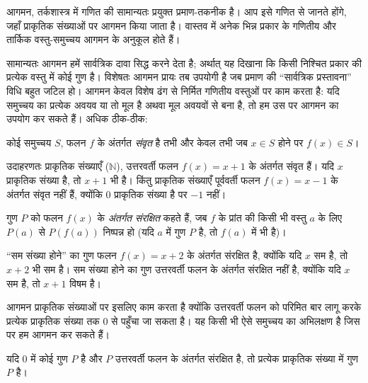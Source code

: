 \documentclass[../../include/open-logic-section]{subfiles}
\begin{document}


\begin{explain}
आगमन, तर्कशास्त्र में गणित की सामान्यतः प्रयुक्त प्रमाण-तकनीक है। आप इसे
गणित से जानते होंगे, जहाँ प्राकृतिक संख्याओं पर आगमन किया जाता है। वास्तव
में अनेक भिन्न प्रकार के गणितीय और तार्किक वस्तु-समुच्चय आगमन के अनुकूल होते
हैं।

सामान्यतः आगमन हमें सार्वत्रिक दावा सिद्ध करने देता है; अर्थात् यह दिखाना कि
किसी निश्चित प्रकार की प्रत्येक वस्तु में कोई गुण है। विशेषतः आगमन प्रायः तब
उपयोगी है जब प्रमाण की ``सार्वत्रिक प्रस्तावना'' विधि बहुत जटिल हो। आगमन केवल
विशेष ढंग से निर्मित गणितीय वस्तुओं पर काम करता है: यदि समुच्चय का प्रत्येक
अवयव या तो मूल है अथवा मूल अवयवों से बना है, तो हम उस पर आगमन का उपयोग कर
सकते हैं। अधिक ठीक-ठीक:
\end{explain}

\begin{defn}
कोई समुच्चय $S$, फलन $f$ के अंतर्गत \emph{संवृत} है तभी और केवल तभी जब
$x \in S$ होने पर $f(x) \in S$।
\end{defn}

\begin{explain}
उदाहरणतः प्राकृतिक संख्याएँ ($\mathbb{N}$), उत्तरवर्ती फलन $f(x) = x+1$ के
अंतर्गत संवृत हैं। यदि $x$ प्राकृतिक संख्या है, तो $x+1$ भी है। किंतु
प्राकृतिक संख्याएँ पूर्ववर्ती फलन $f(x) = x-1$ के अंतर्गत संवृत नहीं हैं,
क्योंकि $0$ प्राकृतिक संख्या है पर $-1$ नहीं।
\end{explain}

\begin{defn}
गुण $P$ को फलन $f(x)$ के \emph{अंतर्गत संरक्षित} कहते हैं, जब $f$ के प्रांत
की किसी भी वस्तु $a$ के लिए $P(a)$ से $P(f(a))$ निष्पन्न हो (यदि $a$ में
गुण $P$ है, तो $f(a)$ में भी है)।
\end{defn}

\begin{explain}
``सम संख्या होने'' का गुण फलन $f(x) = x+2$ के अंतर्गत संरक्षित है, क्योंकि
यदि $x$ सम है, तो $x+2$ भी सम है। सम संख्या होने का गुण उत्तरवर्ती फलन के
अंतर्गत संरक्षित नहीं है, क्योंकि यदि $x$ सम है, तो $x+1$ विषम है।

आगमन प्राकृतिक संख्याओं पर इसलिए काम करता है क्योंकि उत्तरवर्ती फलन को परिमित
बार लागू करके प्रत्येक प्राकृतिक संख्या तक $0$ से पहुँचा जा सकता है। यह
किसी भी ऐसे समुच्चय का अभिलक्षण है जिस पर हम आगमन कर सकते हैं।
\end{explain}

\begin{defn}
यदि 0 में कोई गुण $P$ है और $P$ उत्तरवर्ती फलन के अंतर्गत संरक्षित है, तो
प्रत्येक प्राकृतिक संख्या में गुण $P$ है।
\end{defn}
\end{document}
